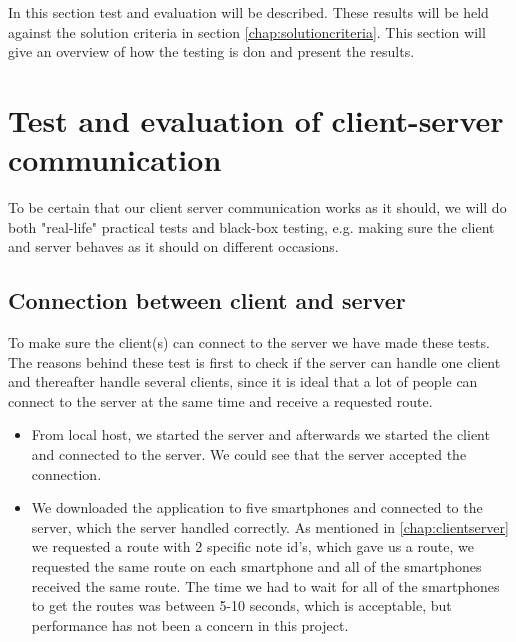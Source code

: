 In this section test and evaluation will be described. These results will be held against the solution criteria in section \ref{chap:solutioncriteria}. This section will  give an overview of how the testing is don and present the results.

\section{Test and evaluation of client-server communication}
To be certain that our client server communication works as it should, we will do both "real-life" practical tests and black-box testing, e.g. making sure the client and server behaves as it should on different occasions.

\subsection{Connection between client and server}
To make sure the client(s) can connect to the server we have made these tests. The reasons behind these test is first to check if the server can handle one client and thereafter handle several clients, since it is ideal that a lot of people can connect to the server at the same time and receive a requested route.
\begin{itemize}
	\item From local host, we started the server and afterwards we started the client and connected to the server. We could see that the server accepted the connection.
	\item We downloaded the application to five smartphones and connected to the server, which the server handled correctly. As mentioned in \autoref{chap:clientserver} we requested a route with 2 specific note id's, which gave us a route, we requested the same route on each smartphone and all of the smartphones received the same route. The time we had to wait for all of the smartphones to get the routes was between 5-10 seconds, which is acceptable, but performance has not been a concern in this project.
\end{itemize}

